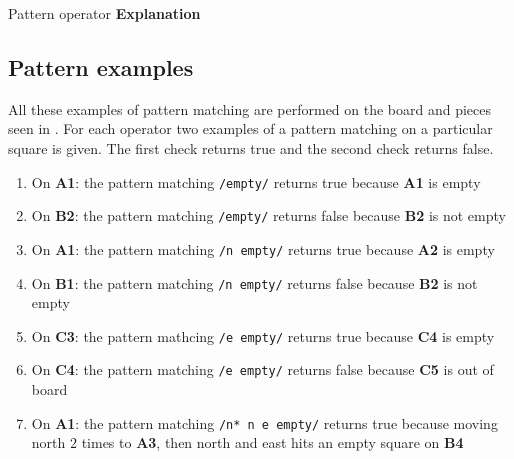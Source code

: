          {Pattern operator                       }{\textbf{Explanation}}{
}

\subsection{Pattern examples}
\label{sec:patternexamples}
All these examples of pattern matching are performed on the board and pieces
seen in . For each operator two examples of a pattern
matching on a particular square is given. The first check returns true and the
second check returns false.

\begin{enumerate}[noitemsep]
  \item On \textbf{A1}: the pattern matching \texttt{/empty/} returns true because
    \textbf{A1} is empty
  \item On \textbf{B2}: the pattern matching \texttt{/empty/} returns false because
    \textbf{B2} is not empty
  \item On \textbf{A1}: the pattern matching \texttt{/n empty/} returns true
    because \textbf{A2} is empty
  \item On \textbf{B1}: the pattern matching \texttt{/n empty/} returns false
    because \textbf{B2} is not empty
  \item On \textbf{C3}: the pattern mathcing \texttt{/e empty/} returns true
    because \textbf{C4} is empty
  \item On \textbf{C4}: the pattern matching \texttt{/e empty/} returns false
    because \textbf{C5} is out of board
  \item On \textbf{A1}: the pattern matching \texttt{/n* n e empty/}
  returns true because moving north $2$ times to \textbf{A3}, then north
  and east hits an empty square on \textbf{B4}
\end{enumerate}

